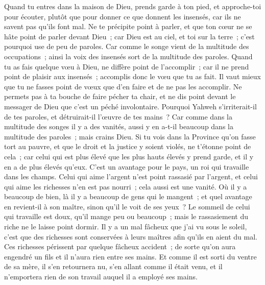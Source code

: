 \begin{multicols}{2}
Quand tu entres dans la maison de Dieu, prends garde à ton pied, et approche-toi pour écouter, plutôt que pour donner ce que donnent les insensés, car ils ne savent pas qu'ils font mal.
\VerseOne{}Ne te précipite point à parler, et que ton cœur ne se hâte point de parler devant Dieu~; car Dieu est au ciel, et toi sur la terre~; c'est pourquoi use de peu de paroles.
Car comme le songe vient de la multitude des occupations~; ainsi la voix des insensés sort de la multitude des paroles.
Quand tu as fais quelque vœu à Dieu, ne diffère point de l'accomplir~; car il ne prend point de plaisir aux insensés~; accomplis donc le vœu que tu as fait.
Il vaut mieux que tu ne fasses point de vœux que d'en faire et de ne pas les accomplir.
Ne permets pas à ta bouche de faire pécher ta chair, et ne dis point devant le messager de Dieu que c'est un péché involontaire. Pourquoi Yahweh s'irriterait-il de tes paroles, et détruirait-il l'œuvre de tes mains~?
Car comme dans la multitude des songes il y a des vanités, aussi y en a-t-il beaucoup dans la multitude des paroles~; mais crains Dieu.
Si tu vois dans la Province qu'on fasse tort au pauvre, et que le droit et la justice y soient violés, ne t'étonne point de cela~; car celui qui est plus élevé que les plus hauts élevés y prend garde, et il y en a de plus élevés qu'eux.
C'est un avantage pour le pays, un roi qui travaille dans les champs.
Celui qui aime l'argent n'est point rassasié par l'argent, et celui qui aime les richesses n'en est pas nourri~; cela aussi est une vanité. 
Où il y a beaucoup de bien, là il y a beaucoup de gens qui le mangent~; et quel avantage en revient-il à son maître, sinon qu'il le voit de ses yeux~? 
Le sommeil de celui qui travaille est doux, qu'il mange peu ou beaucoup~; mais le rassasiement du riche ne le laisse point dormir. 
Il y a un mal fâcheux que j'ai vu sous le soleil, c'est que des richesses sont conservées à leurs maîtres afin qu'ils en aient du mal. 
Ces richesses périssent par quelque fâcheux accident~; de sorte qu'on aura engendré un fils et il n'aura rien entre ses mains.
Et comme il est sorti du ventre de sa mère, il s'en retournera nu, s'en allant comme il était venu, et il n'emportera rien de son travail auquel il a employé ses mains.

\end{multicols}
